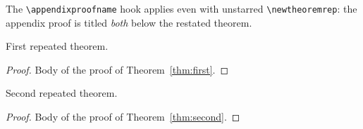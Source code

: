 \documentclass{article}
\date{}
\begin{document}
The \texttt{\textbackslash appendixproofname} hook applies even with
unstarred \texttt{\textbackslash newtheoremrep}: the appendix proof is
titled \emph{both} below the restated theorem.

\begin{theoremrep}\label{thm:first}
  First repeated theorem.
\end{theoremrep}
\begin{proof}
  Body of the proof of Theorem~\ref{thm:first}.
\end{proof}

\begin{theoremrep}\label{thm:second}
  Second repeated theorem.
\end{theoremrep}
\begin{proof}
  Body of the proof of Theorem~\ref{thm:second}.
\end{proof}
\end{document}
